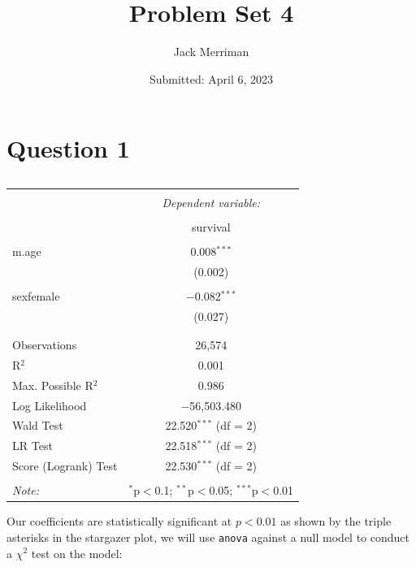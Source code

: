 \documentclass[12pt,letterpaper]{article}
\title{Problem Set 4}
\date{Submitted: April 6, 2023}
\author{Jack Merriman}
\begin{document}
	\maketitle
\section*{Question 1} 



\begin{table}[!htbp] \centering   \caption{}   \label{} \begin{tabular}{@{\extracolsep{5pt}}lc} \\[-1.8ex]\hline \hline \\[-1.8ex]  & \multicolumn{1}{c}{\textit{Dependent variable:}} \\ \cline{2-2} \\[-1.8ex] & survival \\ \hline \\[-1.8ex]  m.age & 0.008$^{***}$ \\   & (0.002) \\   & \\  sexfemale & $-$0.082$^{***}$ \\   & (0.027) \\   & \\ \hline \\[-1.8ex] Observations & 26,574 \\ R$^{2}$ & 0.001 \\ Max. Possible R$^{2}$ & 0.986 \\ Log Likelihood & $-$56,503.480 \\ Wald Test & 22.520$^{***}$ (df = 2) \\ LR Test & 22.518$^{***}$ (df = 2) \\ Score (Logrank) Test & 22.530$^{***}$ (df = 2) \\ \hline \hline \\[-1.8ex] \textit{Note:}  & \multicolumn{1}{r}{$^{*}$p$<$0.1; $^{**}$p$<$0.05; $^{***}$p$<$0.01} \\ \end{tabular} \end{table} 

\noindent Our coefficients are statistically significant at $p<0.01$ as shown by the triple asterisks in the stargazer plot, we will use \texttt{anova} against a null model to conduct a $\chi^2$ test on the model:
\end{document}
